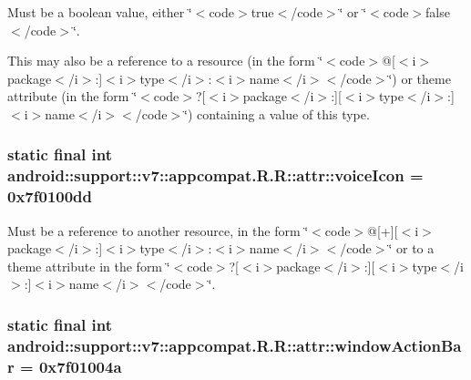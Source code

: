 Must be a boolean value, either \char`\"{}$<$code$>$true$<$/code$>$\char`\"{} or \char`\"{}$<$code$>$false$<$/code$>$\char`\"{}. 

This may also be a reference to a resource (in the form \char`\"{}$<$code$>$@\mbox{[}$<$i$>$package$<$/i$>$:\mbox{]}$<$i$>$type$<$/i$>$:$<$i$>$name$<$/i$>$$<$/code$>$\char`\"{}) or theme attribute (in the form \char`\"{}$<$code$>$?\mbox{[}$<$i$>$package$<$/i$>$:\mbox{]}\mbox{[}$<$i$>$type$<$/i$>$:\mbox{]}$<$i$>$name$<$/i$>$$<$/code$>$\char`\"{}) containing a value of this type. \hypertarget{classandroid_1_1support_1_1v7_1_1appcompat_1_1_r_1_1attr_56dc2a1b9a398b72b473c01c01eb0a90}{
\subsubsection[{voiceIcon}]{\setlength{\rightskip}{0pt plus 5cm}static final int android::support::v7::appcompat.R.R::attr::voiceIcon = 0x7f0100dd}}
\label{classandroid_1_1support_1_1v7_1_1appcompat_1_1_r_1_1attr_56dc2a1b9a398b72b473c01c01eb0a90}


Must be a reference to another resource, in the form \char`\"{}$<$code$>$@\mbox{[}+\mbox{]}\mbox{[}$<$i$>$package$<$/i$>$:\mbox{]}$<$i$>$type$<$/i$>$:$<$i$>$name$<$/i$>$$<$/code$>$\char`\"{} or to a theme attribute in the form \char`\"{}$<$code$>$?\mbox{[}$<$i$>$package$<$/i$>$:\mbox{]}\mbox{[}$<$i$>$type$<$/i$>$:\mbox{]}$<$i$>$name$<$/i$>$$<$/code$>$\char`\"{}. \hypertarget{classandroid_1_1support_1_1v7_1_1appcompat_1_1_r_1_1attr_b64ba8da5b46df4096699bfa67d51c9f}{
\subsubsection[{windowActionBar}]{\setlength{\rightskip}{0pt plus 5cm}static final int android::support::v7::appcompat.R.R::attr::windowActionBar = 0x7f01004a}}
\label{classandroid_1_1support_1_1v7_1_1appcompat_1_1_r_1_1attr_b64ba8da5b46df4096699bfa67d51c9f}


